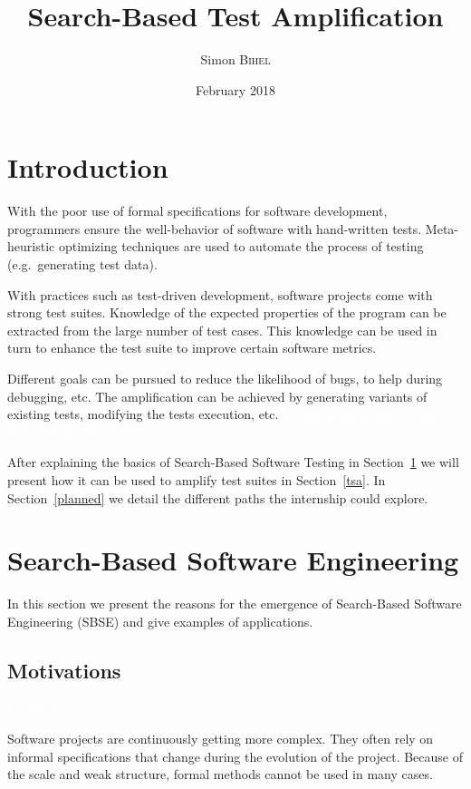 \documentclass[11pt]{sdm}
\title{Search-Based Test Amplification}
\author{Simon \textsc{Bihel}}
\date{February 2018}
\newcommand{\todo}[1]{\colorbox{Red!75}{\textcolor{white}{\textbf{TODO\ifx&#1&\else: #1\fi}}}}
\begin{document}
\maketitle

\section*{Introduction}
\label{intro}

With the poor use of formal specifications for software development, programmers ensure the well-behavior of software with hand-written tests.
Meta-heuristic optimizing techniques are used to automate the process of testing (e.g.\ generating test data).

With practices such as test-driven development, software projects come with strong test suites.
Knowledge of the expected properties of the program can be extracted from the large number of test cases.
This knowledge can be used in turn to enhance the test suite to improve certain software metrics.

Different goals can be pursued to reduce the likelihood of bugs, to help during debugging, etc.
The amplification can be achieved by generating variants of existing tests, modifying the tests execution, etc.
\todo{badly written}

After explaining the basics of Search-Based Software Testing in Section~\ref{sbse} we will present how it can be used to amplify test suites in Section~\ref{tsa}.
In Section~\ref{planned} we detail the different paths the internship could explore.


\section{Search-Based Software Engineering}
\label{sbse}

In this section we present the reasons for the emergence of Search-Based Software Engineering (SBSE) and give examples of applications.

\subsection{Motivations}
\label{motiv}
\todo{}

Software projects are continuously getting more complex.
They often rely on informal specifications that change during the evolution of the project.
Because of the scale and weak structure, formal methods cannot be used in many cases.
\end{document}
